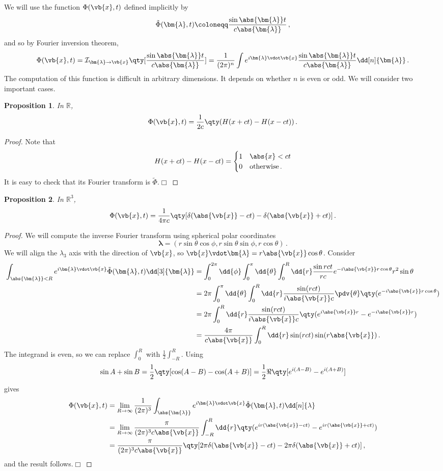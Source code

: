\documentclass{article}
\theoremstyle{plain}\theoremheaderfont{\normalfont\itshape}\theorembodyfont{\rmfamily}\theoremseparator{.}\newtheorem*{rem}{Remark}\newtheorem*{ex}{Example}\newtheorem*{proof}{Proof}\newtheorem*{altp}{Alternative proof}
\theoremstyle{plain}\theoremheaderfont{\normalfont\bfseries}\theorembodyfont{\rmfamily}\theoremseparator{.}\newtheorem{thm}{Theorem}[section]\newtheorem{lem}[thm]{Lemma}\newtheorem{prop}[thm]{Proposition}\newtheorem*{cor}{Corollary}\newtheorem{defn}[thm]{Definition}\newtheorem{clm}[thm]{Claim}\newtheorem{clminproof}{Claim}
\theoremstyle{break}\theoremheaderfont{\normalfont\itshape}\theorembodyfont{\rmfamily}\theoremseparator{.\medskip}\newtheorem*{proofskip}{Proof}\newtheorem*{exs}{Examples}\newtheorem*{rems}{Remarks}
\theoremstyle{break}\theoremheaderfont{\normalfont\bfseries}\theorembodyfont{\rmfamily}\theoremseparator{.\medskip}\newtheorem{lemskip}[thm]{Lemma}\newtheorem{defnskip}[thm]{Definition}\newtheorem{propskip}[thm]{Proposition}\newtheorem{thmskip}[thm]{Theorem}
\numberwithin{equation}{section}
\newcommand{\qed}{\hfill\ensuremath{\Box}}
\newcommand{\bl}{\bm{\lambda}}
\begin{document}
	We will use the function \(\Phi(\vb{x},t)\) defined implicitly by
	\[\tilde{\Phi}(\bl,t)\coloneqq\frac{\sin\abs{\bl}t}{c\abs{\bl}}\,,\]
	and so by Fourier inversion theorem,
	\[\Phi(\vb{x},t)=\mathcal{I}_{\bl\to\vb{x}}\qty[\frac{\sin\abs{\bl}t}{c\abs{\bl}}]=\frac{1}{(2\pi)^n}\int e^{i\bl\vdot\vb{x}}\frac{\sin\abs{\bl}t}{c\abs{\bl}}\dd[n]{\bl}\,.\]
	The computation of this function is difficult in arbitrary dimensions. It depends on whether \(n\) is even or odd. We will consider two important cases.
	\begin{prop}
		In \(\mathbb{R}\),
		\[\Phi(\vb{x},t)=\frac{1}{2c}\qty(H(x+ct)-H(x-ct))\,.\]
	\end{prop}
	\begin{proof}
		Note that
		\[H(x+ct)-H(x-ct)=\begin{cases}
			1 & \abs{x}<ct\\
			0 & \text{otherwise}\,.
		\end{cases}\]
		It is easy to check that its Fourier transform is \(\tilde{\Phi}\).\qed
	\end{proof}
	\begin{prop}
		In \(\mathbb{R}^3\),
		\[\Phi(\vb{x},t)=\frac{1}{4\pi c}\qty[\delta(\abs{\vb{x}}-ct)-\delta(\abs{\vb{x}}+ct)]\,.\]
	\end{prop}
	\begin{proof}
		We will compute the inverse Fourier transform using spherical polar coordinates
		\[\bl=(r\sin\theta\cos\phi,r\sin\theta\sin\phi,r\cos\theta)\,.\]
		We will align the \(\lambda_3\) axis with the direction of \(\vb{x}\), so \(\vb{x}\vdot\bl=r\abs{\vb{x}}\cos\theta\). Consider
		\begin{align*}
			\int_{\abs{\bl}<R}e^{i\bl\vdot\vb{x}}\tilde{\Phi}(\bl,t)\dd[3]{\bl}&=\int_{0}^{2\pi}\dd{\phi}\int_{0}^{\pi}\dd{\theta}\int_{0}^{R}\dd{r}\frac{\sin{rct}}{rc}e^{-i\abs{\vb{x}}r\cos\theta}r^2\sin\theta\\
			&=2\pi\int_{0}^{\pi}\dd{\theta}\int_{0}^{R}\dd{r}\frac{\sin(rct)}{i\abs{\vb{x}}c}\pdv{\theta}\qty(e^{-i\abs{\vb{x}}r\cos\theta})\\
			&=2\pi\int_{0}^{R}\dd{r}\frac{\sin(rct)}{i\abs{\vb{x}}c}\qty(e^{i\abs{\vb{x}}r}-e^{-i\abs{\vb{x}}r})\\
			&=\frac{4\pi}{c\abs{\vb{x}}}\int_{0}^{R}\dd{r}\sin(rct)\sin(r\abs{\vb{x}})\,.
		\end{align*}
		The integrand is even, so we can replace \(\int_{0}^{R}\) with \(\frac{1}{2}\int_{-R}^{R}\). Using
		\[\sin A+\sin B=\frac{1}{2}\qty[\cos(A-B)-\cos(A+B)]=\frac{1}{2}\Re\qty[e^{i(A-B)}-e^{i(A+B)}]\]
		gives
		\begin{align*}
			\Phi(\vb{x},t)&=\lim_{R\to\infty}\frac{1}{(2\pi)^3}\int_{\abs{\bl}}e^{i\bl\vdot\vb{x}}\tilde{\Phi}(\bl,t)\dd[n]{\lambda}\\
			&=\lim_{R\to\infty}\frac{\pi}{(2\pi)^3c\abs{\vb{x}}}\int_{-R}^{R}\dd{r}\qty(e^{ir(\abs{\vb{x}}-ct)}-e^{ir(\abs{\vb{x}}+ct)})\\
			&=\frac{\pi}{(2\pi)^3c\abs{\vb{x}}}\qty[2\pi\delta(\abs{\vb{x}}-ct)-2\pi\delta(\abs{\vb{x}}+ct)]\,,
		\end{align*}
		and the result follows.\qed
	\end{proof}
\end{document}
